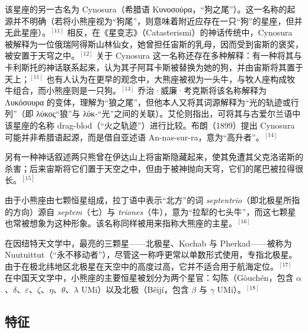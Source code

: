 该星座的另一古名为 Cynosura（希腊语 Κυνοσούρα，“狗之尾”）。这一名称的起源并不明确（若将小熊座视为“狗尾”，则意味着附近应存在一只“狗”的星座，但并无此星座）。$^{[11]}$ 相反，在《星变志》（Catasterismi）的神话传统中，Cynosura 被解释为一位俄瑞阿得斯山林仙女，她曾担任宙斯的乳母，因而受到宙斯的褒奖，被安置于天穹之中。$^{[12]}$ 关于 Cynosura 这一名称还存在多种解释：有一种将其与卡利斯托的神话联系起来，认为其子阿耳卡斯被替换为她的狗，并由宙斯将其置于天上；$^{[11]}$ 也有人认为在更早的观念中，大熊座被视为一头牛，与牧人座构成牧牛组合，而小熊座则是一只狗。$^{[13]}$ 乔治·威廉·考克斯将该名称解释为 Λυκόσουρα 的变体，理解为“狼之尾”，但他本人又将其词源解释为“光的轨迹或行列”（即 λύκος“狼”与 λύκ-“光”之间的关联）。艾伦则指出，可将其与古爱尔兰语中该星座的名称 drag-blod（“火之轨迹”）进行比较。布朗（1899）提出 Cynosura 可能并非希腊语起源，而是借自亚述语 An-nas-sur-ra，意为“高升者”。$^{[14]}$  

另有一种神话叙述两只熊曾在伊达山上将宙斯隐藏起来，使其免遭其父克洛诺斯的杀害；后来宙斯将它们置于天空之中，但由于被神抛向天穹，它们的尾巴被拉得很长。$^{[15]}$  

由于小熊座由七颗恒星组成，拉丁语中表示“北方”的词 \emph{septentrio}（即北极星所指的方向）源自 \emph{septem}（七）与 \emph{triones}（牛），意为“拉犁的七头牛”，而这七颗星也常被想象为这种形象。该名称同样被用来指称大熊座的主星。$^{[16]}$  

在因纽特天文学中，最亮的三颗星——北极星、Kochab 与 Pherkad——被称为 Nuutuittut（“永不移动者”），尽管这一称呼更常以单数形式使用，专指北极星。由于在极北纬地区北极星在天空中的高度过高，它并不适合用于航海定位。$^{[17]}$ 在中国天文学中，小熊座的主要恒星被划分为两个星官：勾陈（Gòuchén，包含 $\alpha$、$\delta$、$\varepsilon$、$\zeta$、$\eta$、$\theta$、$\lambda$ UMi）以及北极（Běijí，包含 $\beta$ 与 $\gamma$ UMi）。$^{[18]}$  
\subsection{特征}

